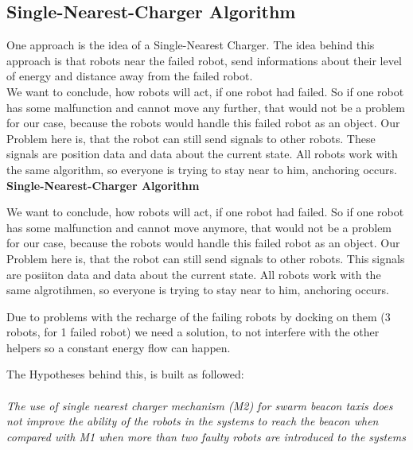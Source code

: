 \documentclass[
	a4paper,
	article,
	pagesize,
	pdftex,
	12pt,
	english,
	fleqn,
	final,
	]{scrartcl}
\begin{document}
\subsection{Single-Nearest-Charger Algorithm}
One approach is the idea of a Single-Nearest Charger.
The idea behind this approach is that robots near the failed robot, send informations about their level of energy and distance away from the failed robot.\\
We want to conclude, how robots will act, if one robot had failed. So if one robot has some malfunction and cannot move any further, that would not be a problem for our case, because the robots would handle this failed robot as an object. Our Problem here is, that the robot can still send signals to other robots. These signals are position data and data about the current state. All robots work with the same algorithm, so everyone is trying to stay near to him, anchoring occurs. \\

\textbf{Single-Nearest-Charger Algorithm}
\newline

We want to conclude, how robots will act, if one robot had failed. So if one robot has some malfunction and cannot move anymore, that would not be a problem for our case, because the robots would handle this failed robot as an object. Our Problem here is, that the robot can still send signals to other robots. This signals are posiiton data and data about the current state. All robots work with the same algrotihmen, so everyone is trying to stay near to him, anchoring occurs. \newline

Due to problems with the recharge of the failing robots by docking on them (3 robots, 
for 1 failed robot) we need a solution, to not interfere with the other helpers so a constant energy flow can happen.

The Hypotheses behind this, is built as followed: 
\\
\\
\textit{The use of single nearest charger mechanism (M2) for swarm beacon
	taxis does not improve the ability of the robots in the systems to
	reach the beacon when compared with M1 when more than two faulty
	robots are introduced to the systems}
\newline
\end{document}
